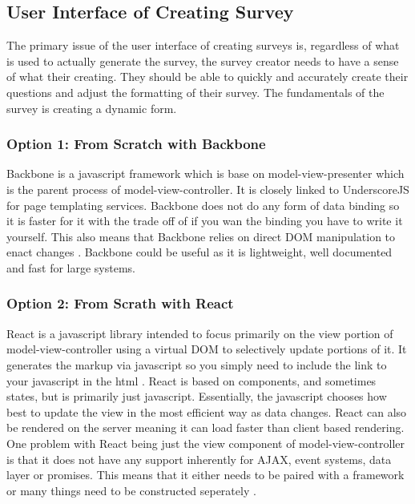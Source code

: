 \documentclass[letterpaper,10pt,serif, draftclsnofoot,onecolumn, compsoc, titlepage]{IEEEtran}
\begin{document}
\subsection{User Interface of Creating Survey}
The primary issue of the user interface of creating surveys is, regardless of what is used to actually generate the survey, the 
survey creator needs to have a sense of what their creating. They should be able to quickly and accurately create their questions
and adjust the formatting of their survey. The fundamentals of the survey is creating a dynamic form.
\subsubsection{Option 1: From Scratch with Backbone}
Backbone is a javascript framework which is base on model-view-presenter which is the parent process of model-view-controller. It is
 closely linked to UnderscoreJS for page templating services. Backbone does not do any form of data binding so it is faster for it with the trade off of if you wan the binding you have to write it yourself. This also means that Backbone relies on direct DOM manipulation
 to enact changes \cite{backbone}. Backbone could be useful as it is lightweight, well documented and fast for large systems.
\subsubsection{Option 2: From Scrath with React}
React is a javascript library intended to focus primarily on the view portion of model-view-controller using a virtual DOM to selectively update portions of it. It generates the markup via javascript so you simply need to include the link to your javascript in the html \cite{react}. React is based on components, and sometimes states, but is primarily just javascript. Essentially, the javascript chooses how best to update the view in the most efficient way as data changes. React can also be rendered on the server meaning it can load faster than client based rendering. One problem with React
 being just the view component of model-view-controller is that it does not have any support inherently for AJAX, event systems, 
 data layer or promises. This means that it either needs to be paired with a framework or many things need to be constructed seperately \cite{reactStupid}. 
\end{document}
